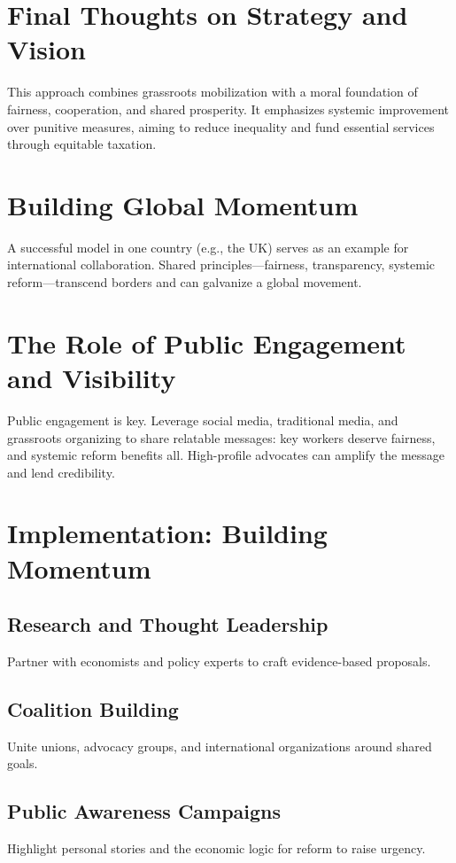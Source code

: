 \documentclass[11pt,a4paper]{article}
\begin{document}
\section{Final Thoughts on Strategy and Vision}
This approach combines grassroots mobilization with a moral foundation of fairness, cooperation, and shared prosperity. It emphasizes systemic improvement over punitive measures, aiming to reduce inequality and fund essential services through equitable taxation.

\section{Building Global Momentum}
A successful model in one country (e.g., the UK) serves as an example for international collaboration. Shared principles—fairness, transparency, systemic reform—transcend borders and can galvanize a global movement.

\section{The Role of Public Engagement and Visibility}
Public engagement is key. Leverage social media, traditional media, and grassroots organizing to share relatable messages: key workers deserve fairness, and systemic reform benefits all. High-profile advocates can amplify the message and lend credibility.

\section{Implementation: Building Momentum}
\subsection{Research and Thought Leadership}
Partner with economists and policy experts to craft evidence-based proposals.

\subsection{Coalition Building}
Unite unions, advocacy groups, and international organizations around shared goals.

\subsection{Public Awareness Campaigns}
Highlight personal stories and the economic logic for reform to raise urgency.
\end{document}
